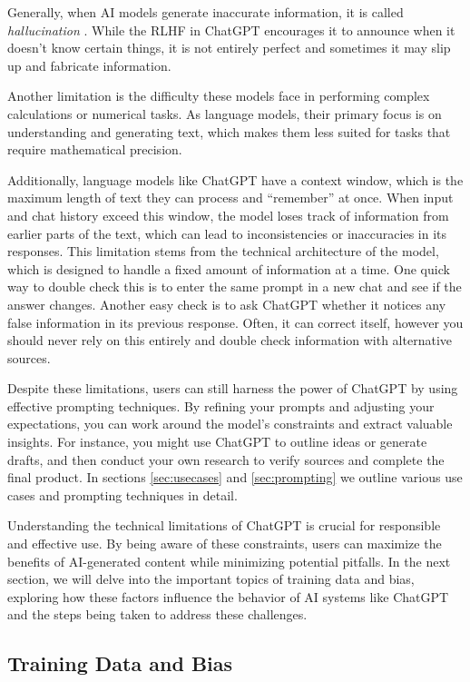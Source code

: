 \documentclass[12pt]{article}
\begin{document}
Generally, when AI models generate inaccurate information, it is called \textit{hallucination} \cite{Hallucination}. While the RLHF in ChatGPT encourages it to announce when it doesn't know certain things, it is not entirely perfect and sometimes it may slip up and fabricate information.

Another limitation is the difficulty these models face in performing complex calculations or numerical tasks. As language models, their primary focus is on understanding and generating text, which makes them less suited for tasks that require mathematical precision.

Additionally, language models like ChatGPT have a context window, which is the maximum length of text they can process and ``remember'' at once. When input and chat history exceed this window, the model loses track of information from earlier parts of the text, which can lead to inconsistencies or inaccuracies in its responses. This limitation stems from the technical architecture of the model, which is designed to handle a fixed amount of information at a time. One quick way to double check this is to enter the same prompt in a new chat and see if the answer changes. Another easy check is to ask ChatGPT whether it notices any false information in its previous response. Often, it can correct itself, however you should never rely on this entirely and double check information with alternative sources.


Despite these limitations, users can still harness the power of ChatGPT by using effective prompting techniques. By refining your prompts and adjusting your expectations, you can work around the model's constraints and extract valuable insights. For instance, you might use ChatGPT to outline ideas or generate drafts, and then conduct your own research to verify sources and complete the final product. In sections \ref{sec:usecases} and \ref{sec:prompting} we outline various use cases and prompting techniques in detail.

Understanding the technical limitations of ChatGPT is crucial for responsible and effective use. By being aware of these constraints, users can maximize the benefits of AI-generated content while minimizing potential pitfalls. In the next section, we will delve into the important topics of training data and bias, exploring how these factors influence the behavior of AI systems like ChatGPT and the steps being taken to address these challenges.

\subsection{Training Data and Bias}\label{sec:training}
\end{document}
